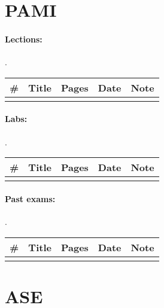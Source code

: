 \documentclass[a4paper,12pt]{article} %
\begin{document}
\newpage
\section{PAMI}
\paragraph{Lections:} .\\
\begin{tabularx}{\textwidth}{|l|X|c|l|c|}
	\hline
	\# & Title & Pages & Date & Note \\
	\hline
	&  &  &  &  \\
	\hline
\end{tabularx}

\paragraph{Labs:}.\\
\begin{tabularx}{\textwidth}{|l|X|c|l|c|}
	\hline
	\# & Title & Pages & Date & Note \\
	\hline
	&  &  &  &  \\
	\hline
\end{tabularx}

\paragraph{Past exams:}.\\
\begin{tabularx}{\textwidth}{|l|X|c|l|c|}
	\hline
	\# & Title & Pages & Date & Note \\
	\hline
	&  &  &  &  \\
	\hline
\end{tabularx}

\newpage
\section{ASE}
\end{document}
